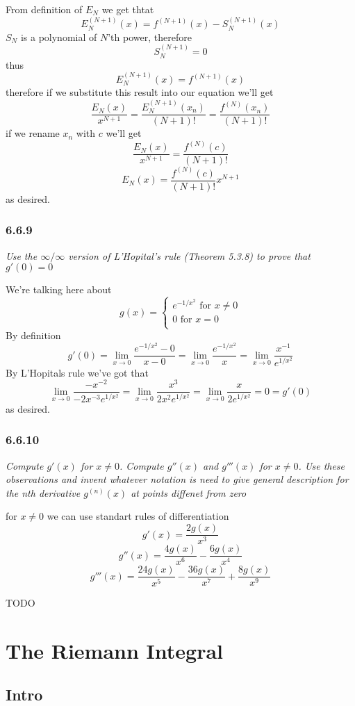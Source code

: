 \documentclass[11pt,oneside,titlepage]{book}
\begin{document}
From definition of $E_N$ we get thtat
$$E_N^{(N + 1)}(x) = f^{(N + 1)}(x) - S_N^{(N + 1)}(x)$$
$S_N$ is a polynomial of $N$'th power, therefore
$$S_N^{(N + 1)} = 0$$
thus
$$E_N^{(N + 1)}(x) = f^{(N + 1)}(x)$$
therefore if we substitute this result into our equation we'll get
$$\frac{E_N(x)}{x^{N + 1}} =
\frac{E_N^{(N + 1)}(x_n)}{(N + 1)!} = \frac{f^{(N)}(x_n)}{(N + 1)!} $$
if we rename $x_n$ with $c$ we'll get 
$$\frac{E_N(x)}{x^{N + 1}} = \frac{f^{(N)}(c)}{(N + 1)!} $$
$$E_N(x) = \frac{f^{(N)}(c)}{(N + 1)!} x^{N + 1}$$
as desired.

\subsection*{6.6.9}
\textit{Use the $\infty/\infty$ version of L'Hopital's rule (Theorem 5.3.8) to
  prove that $g'(0) = 0$}

We're talking here about
$$g(x) =
\begin{cases}
  e^{-1/x^2} \text{ for } x \neq 0 \\
  0 \text{ for } x = 0 \\
\end{cases}
$$
By definition
$$g'(0) = \lim_{x \to 0}{\frac{e^{-1/x^2} - 0}{x - 0}} =
\lim_{x \to 0}{\frac{e^{-1/x^2}}{x}} =
\lim_{x \to 0}{\frac{x^{-1}}{e^{1/x^2}}}$$
By L'Hopitals rule we've got that
$$\lim_{x \to 0}{\frac{- x^{-2}}{-2x^{-3}e^{1/x^2}}} =
\lim_{x \to 0}{\frac{x^{3}}{2x^{2}e^{1/x^2}}} =
\lim_{x \to 0}{\frac{x}{2e^{1/x^2}}} = 0 = g'(0)
$$
as desired.

\subsection*{6.6.10}
\textit{Compute $g'(x)$ for $x \neq 0$. Compute $g''(x)$ and $g'''(x)$ for
  $x \neq 0$. Use these observations and invent whatever notation is need to
  give general description for the nth derivative $g^{(n)}(x)$ at points
  diffenet from zero}

for $x \neq 0$ we can use standart rules of differentiation
$$g'(x) = \frac{2 g(x)}{x^3}$$
$$g''(x) = \frac{4 g(x)}{x^6} - \frac{6 g(x)}{x^4}$$
$$g'''(x) = \frac{24 g(x)}{x^5} - \frac{36 g(x)}{x^7} + \frac{8 g(x)}{x^9}$$

TODO

\chapter{The Riemann Integral}

\section{Intro}
\end{document}
